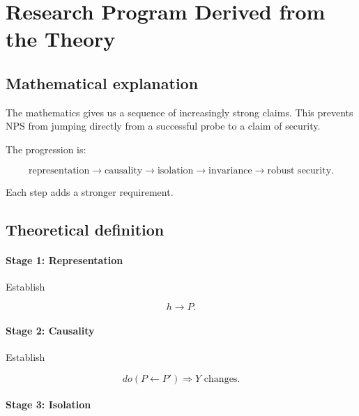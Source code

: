 \documentclass[11pt]{article}
\begin{document}
\section{Research Program Derived from the Theory}

\subsection*{Mathematical explanation}

The mathematics gives us a sequence of increasingly strong claims. This
prevents NPS from jumping directly from a successful probe to a claim of
security.

The progression is:

\begin{equation}
\boxed{
\text{representation}
\rightarrow
\text{causality}
\rightarrow
\text{isolation}
\rightarrow
\text{invariance}
\rightarrow
\text{robust security}.
}
\end{equation}

Each step adds a stronger requirement.

\subsection*{Theoretical definition}

\paragraph{Stage 1: Representation}

Establish

\begin{equation}
h\rightarrow P.
\end{equation}

\paragraph{Stage 2: Causality}

Establish

\begin{equation}
do(P\leftarrow P')
\Rightarrow
Y\text{ changes}.
\end{equation}

\paragraph{Stage 3: Isolation}
\end{document}
